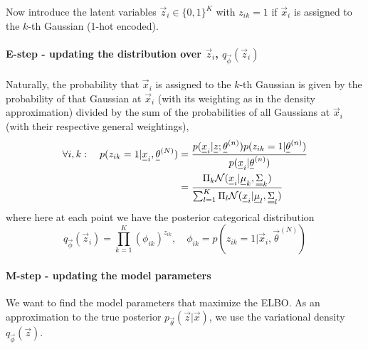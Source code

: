 Now introduce the latent variables $\vec{z}_i \in \{0,1\}^K$ with $z_{ik} = 1$ if $\vec{x}_i$ is assigned to the $k$-th Gaussian
(1-hot encoded).

\paragraph*{E-step - updating the distribution over $\vec{z}_i$, $q_\vec{\phi}(\vec{z}_i)$} Naturally, the probability that $\vec{x}_i$ is assigned to the $k$-th Gaussian is given by
the probability of that Gaussian at $\vec{x}_i$ (with its weighting as in the density approximation) divided by the sum of the probabilities of all Gaussians at $\vec{x}_i$ (with their respective
general weightings),
\begin{equation}
    \begin{aligned}
        \forall i,k: \quad p(z_{ik} = 1 | \vec{x}_i, \vec{\theta}^{(N)}) &= \frac{p(\vec{x}_i|\vec{z};\vec{\theta}^{(n)}) p(z_{ik} = 1 | \vec{\theta}^{(n)})}{p(\vec{x}_i | \vec{\theta}^{(n)})} \\
        &= \frac{\Pi_k \mathcal{N}(\vec{x}_i | \vec{\mu}_k, \mat{\Sigma}_k)}{\sum_{l=1}^{K} \Pi_l \mathcal{N}(\vec{x}_i | \vec{\mu}_l, \mat{\Sigma}_l)}
    \end{aligned}
\end{equation}
where here at each point we have the posterior categorical distribution
\begin{equation}
    q_{\vec{\phi}}(\vec{z}_i) = \prod_{k=1}^{K} \left( \phi_{ik} \right)^{z_{ik}}, \quad \phi_{ik} = p\left(z_{ik} = 1 | \vec{x}_i, \vec{\theta}^{(N)}\right)
\end{equation}

\paragraph*{M-step - updating the model parameters} We want to find the model parameters that maximize the ELBO. As an approximation
to the true posterior $p_{\vec{\theta}}(\vec{z} | \vec{x})$, we use the variational density $q_{\vec{\phi}}(\vec{z})$.


